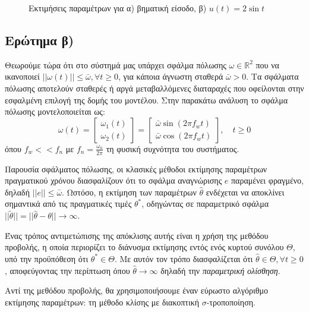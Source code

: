\documentclass[a4paper,12pt]{article}
\begin{document}
\begin{figure}[htbp]
\begin{subfigure}[b]{0.45\textwidth}
    \caption{}
    \label{fig:task1_parameter_estimations_sinusoidal}
  \end{subfigure}
  \caption{Εκτιμήσεις παραμέτρων για α) βηματική είσοδο, β) $u(t) = 2 \sin t$}
  \label{fig:task1_parameter_estimations}
\end{figure}


\subsection*{Ερώτημα β)}
Θεωρούμε τώρα ότι στο σύστημά μας υπάρχει σφάλμα πόλωσης $\omega \in \mathbb{R}^2$ που να ικανοποιεί
$||\omega(t)|| \leq \bar{\omega}, \forall t \geq 0$, για κάποια άγνωστη σταθερά $\bar{\omega} > 0$.
Τα σφάλματα πόλωσης αποτελούν σταθερές ή αργά μεταβαλλόμενες διαταραχές που οφείλονται στην εσφαλμένη 
επιλογή της δομής του μοντέλου. Στην παρακάτω ανάλυση το σφάλμα πόλωσης μοντελοποιείται ως:
\begin{equation}
    \omega(t) = 
    \begin{bmatrix}
        \omega_1(t) \\
        \omega_2(t)
    \end{bmatrix} = 
    \begin{bmatrix}
        \bar{\omega} \sin(2 \pi f_w t) \\
        \bar{\omega} \cos(2 \pi f_w t)
    \end{bmatrix}, \quad t \geq 0
    \label{eq:bias_error}
\end{equation}
όπου $f_w << f_n$ με $f_n = \frac{\omega_n}{2 \pi}$ τη φυσική συχνότητα του συστήματος.

Παρουσία σφάλματος πόλωσης, οι κλασικές μέθοδοι εκτίμησης παραμέτρων πραγματικού χρόνου διασφαλίζουν ότι 
το σφάλμα αναγνώρισης $e$ παραμένει φραγμένο, δηλαδή $||e|| \leq \bar{\omega}$. Ωστόσο, η εκτίμηση των
παραμέτρων $\hat{\theta}$ ενδέχεται να αποκλίνει σημαντικά από τις πραγματικές τιμές $\theta^*$, 
οδηγώντας σε παραμετρικό σφάλμα $||\tilde{\theta}|| = ||\hat{\theta} - \theta|| \to \infty$.

Ένας τρόπος αντιμετώπισης της απόκλισης αυτής είναι η χρήση της μεθόδου προβολής, η οποία περιορίζει το 
διάνυσμα εκτίμησης εντός ενός κυρτού συνόλου $\Theta$, υπό την προϋπόθεση ότι $\theta^* \in \Theta$. 
Με αυτόν τον τρόπο διασφαλίζεται ότι $\hat{\theta} \in \Theta, \forall t \ge 0$, αποφεύγοντας την περίπτωση 
όπου $\hat{\theta} \to \infty$ δηλαδή την \textit{παραμετρική ολίσθηση}.

Αντί της μεθόδου προβολής, θα χρησιμοποιήσουμε έναν εύρωστο αλγόριθμο εκτίμησης παραμέτρων: 
τη μέθοδο κλίσης με διακοπτική $\sigma$-τροποποίηση.
\end{document}

